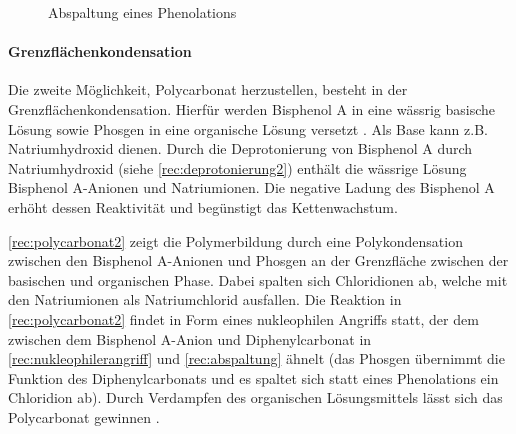 {    \begin{figure}[H]
        \begin{center}
            \footnotesize
            \setatomsep{1.7em}


            \vspace{10pt}

            \chemrel{->}
            \chemnameinit{}
            \chemsign{+}

            \caption{Abspaltung eines Phenolations}
            \label{rec:abspaltung}
        \end{center}
    \end{figure}
}{}

\newpage

\paragraph{Grenzflächenkondensation} Die zweite Möglichkeit, Polycarbonat
herzustellen, besteht in der Grenzflächenkondensation. Hierfür werden Bisphenol
A in eine wässrig basische Lösung sowie Phosgen in eine organische Lösung
versetzt \cite{cuzpe}. Als Base kann z.B. Natriumhydroxid dienen. Durch die
Deprotonierung von Bisphenol A durch Natriumhydroxid (siehe
\autoref{rec:deprotonierung2}) enthält die wässrige Lösung Bisphenol A-Anionen
und Natriumionen. Die negative Ladung des Bisphenol A erhöht dessen Reaktivität
und begünstigt das Kettenwachstum.

\autoref{rec:polycarbonat2} zeigt die Polymerbildung durch eine Polykondensation
zwischen den Bisphenol A-Anionen und Phosgen an der Grenzfläche zwischen der
basischen und organischen Phase. Dabei spalten sich Chloridionen ab, welche mit
den Natriumionen als Natriumchlorid ausfallen. Die Reaktion in
\autoref{rec:polycarbonat2} findet in Form eines nukleophilen Angriffs statt,
der dem zwischen dem Bisphenol A-Anion und Diphenylcarbonat in
\autoref{rec:nukleophilerangriff} und \autoref{rec:abspaltung} ähnelt (das
Phosgen übernimmt die Funktion des Diphenylcarbonats und es spaltet sich statt
eines Phenolations ein Chloridion ab). Durch Verdampfen des organischen
Lösungsmittels lässt sich das Polycarbonat gewinnen \cite{garoo}.

